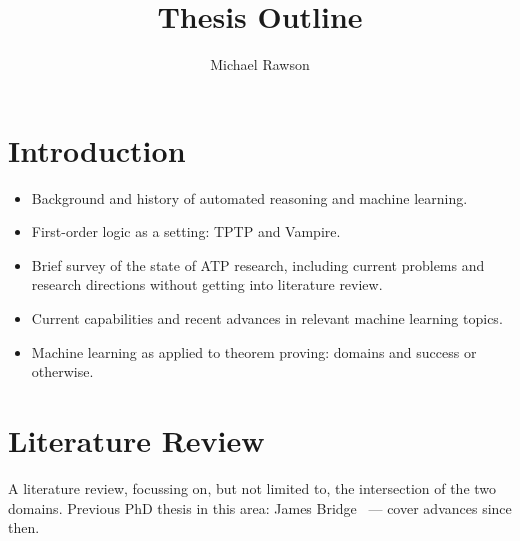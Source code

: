 \documentclass[a4paper]{article}
\title{Thesis Outline}
\author{Michael Rawson}
\begin{document}
\maketitle
{}
\section{Introduction}
\begin{itemize}
	\item Background and history of automated reasoning and machine learning.
	\item First-order logic as a setting: TPTP and Vampire.
	\item Brief survey of the state of ATP research, including current problems and research directions without getting into literature review.
	\item Current capabilities and recent advances in relevant machine learning topics.
	\item Machine learning as applied to theorem proving: domains and success or otherwise.
\end{itemize}

\section{Literature Review}
\label{sec:lit-review}
A literature review, focussing on, but not limited to, the intersection of the two domains.
Previous PhD thesis in this area: James Bridge~\cite{bridge} --- cover advances since then.
\end{document}

